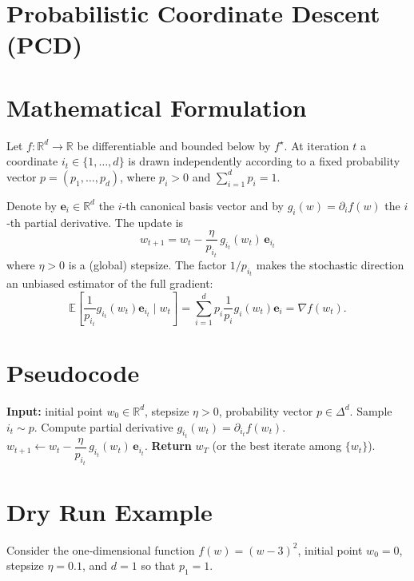 \documentclass{article}
\newcommand{\E}{\mathbb{E}}
\newcommand{\R}{\mathbb{R}}
\newcommand{\grad}{\nabla}
\newcommand{\be}{\mathbf e}
\begin{document}
\section*{Probabilistic Coordinate Descent (PCD)}

\section*{Mathematical Formulation}
Let $f:\R^{d}\rightarrow\R$ be differentiable and bounded below by $f^{\star}$.  
At iteration $t$ a coordinate $i_{t}\in\{1,\dots ,d\}$ is drawn independently
according to a fixed probability vector $p=(p_{1},\dots ,p_{d})$, where
$p_{i}>0$ and $\sum_{i=1}^{d}p_{i}=1$.

Denote by $\be_{i}\in\R^{d}$ the $i$‑th canonical basis vector and by 
$g_{i}(w)=\partial_{i}f(w)$ the $i$‑th partial derivative.
The update is
\[
\boxed{
w_{t+1}=w_{t}-\frac{\eta}{p_{i_{t}}}\, g_{i_{t}}(w_{t})\,\be_{i_{t}}
}
\tag{1}
\]
where $\eta>0$ is a (global) stepsize.  
The factor $1/p_{i_{t}}$ makes the stochastic direction an unbiased estimator
of the full gradient:
\[
\E\!\left[\frac{1}{p_{i_{t}}}g_{i_{t}}(w_{t})\be_{i_{t}}\mid w_{t}\right]
= \sum_{i=1}^{d}p_{i}\frac{1}{p_{i}}g_{i}(w_{t})\be_{i}
= \grad f(w_{t}).                                      \tag{2}
\]

\section*{Pseudocode}
\begin{algorithm}[H]
\caption{Probabilistic Coordinate Descent}
\begin{algorithmic}[1]
\STATE \textbf{Input:} initial point $w_{0}\in\R^{d}$, stepsize $\eta>0$, 
probability vector $p\in\Delta^{d}$.
    \STATE Sample $i_{t}\sim p$.
    \STATE Compute partial derivative $g_{i_{t}}(w_{t})=\partial_{i_{t}}f(w_{t})$.
    \STATE $w_{t+1}\gets w_{t}-\dfrac{\eta}{p_{i_{t}}}\,g_{i_{t}}(w_{t})\,\be_{i_{t}}$.
\ENDFOR
\STATE \textbf{Return} $w_{T}$ (or the best iterate among $\{w_{t}\}$).
\end{algorithmic}
\end{algorithm}

\section*{Dry Run Example}
Consider the one‑dimensional function $f(w)=(w-3)^{2}$, initial point $w_{0}=0$,
stepsize $\eta=0.1$, and $d=1$ so that $p_{1}=1$.
\end{document}
